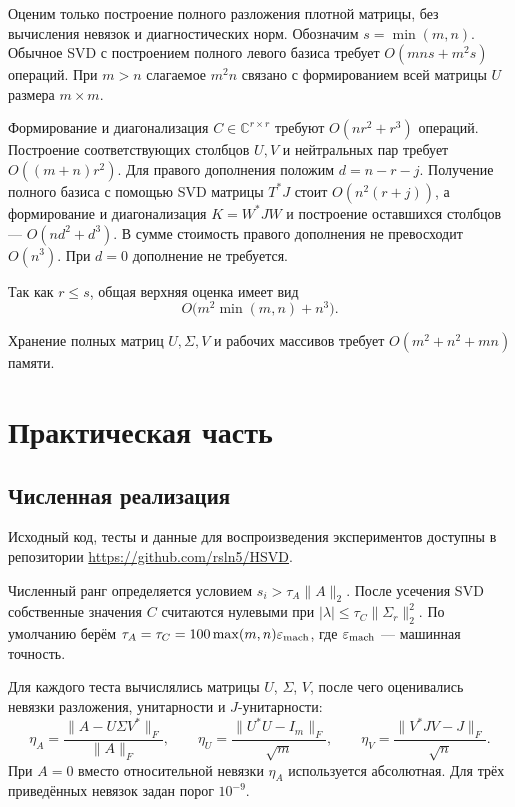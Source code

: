 \documentclass[a4paper,12pt]{article}
\theoremstyle{csstyle}
\newcommand{\HSVDComplex}{\mathbb C}
\begin{document}
Оценим только построение полного разложения плотной матрицы,
без вычисления невязок и диагностических норм.
Обозначим $s=\min(m,n)$. Обычное SVD с построением полного левого
базиса требует $O(mns+m^2s)$ операций. При $m>n$ слагаемое $m^2n$
связано с формированием всей матрицы $U$ размера $m\times m$.

Формирование и диагонализация $C\in\HSVDComplex^{r\times r}$ требуют
$O(nr^2+r^3)$ операций. Построение соответствующих столбцов $U,V$
и нейтральных пар требует $O((m+n)r^2)$.
Для правого дополнения положим $d=n-r-j$.
Получение полного базиса с помощью SVD матрицы $T^*J$ стоит
$O(n^2(r+j))$, а формирование и диагонализация $K=W^*JW$
и построение оставшихся столбцов --- $O(nd^2+d^3)$.
В сумме стоимость правого дополнения не превосходит $O(n^3)$.
При $d=0$ дополнение не требуется.

Так как $r\le s$, общая верхняя оценка имеет вид
\[
O\bigl(m^2\min(m,n)+n^3\bigr).
\]

Хранение полных матриц $U,\Sigma,V$ и рабочих массивов требует
$O(m^2+n^2+mn)$ памяти.


\section{Практическая часть}
\label{sec:empirical}\label{sec:experiments}

\subsection{Численная реализация}
Исходный код, тесты и данные для воспроизведения экспериментов доступны
в репозитории \url{https://github.com/rsln5/HSVD}.

Численный ранг определяется условием $s_i>\tau_A\|A\|_2$.
После усечения SVD собственные значения $C$ считаются нулевыми при
$|\lambda|\leq\tau_C\|\Sigma_r\|_2^2$.
По умолчанию берём $\tau_A=\tau_C=100\max(m,n)\varepsilon_{\rm mach}$,
где $\varepsilon_{\rm mach}$ --- машинная точность.

Для каждого теста вычислялись матрицы $U$, $\Sigma$, $V$, после чего
оценивались невязки разложения, унитарности и $J$-унитарности:
\begin{equation}\label{eq:metrics}
\eta_A=\frac{\|A-U\Sigma V^*\|_F}{\|A\|_F},\qquad
\eta_U=\frac{\|U^*U-I_m\|_F}{\sqrt m},\qquad
\eta_V=\frac{\|V^*JV-J\|_F}{\sqrt n}.
\end{equation}
При $A=0$ вместо относительной невязки $\eta_A$ используется абсолютная.
Для трёх приведённых невязок задан порог $10^{-9}$.
\end{document}
